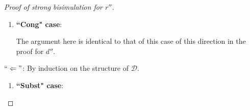 \documentclass[11pt]{article} %
\begin{document}
\begin{proof}[Proof of strong bisimulation for $r''$]
\begin{enumerate}
\begin{itemize}
From here, the argument proceeds analogously to that of $`` \Rightarrow "$, ``Subst" case, Case 1, in the proof for $d''$.

\item \underline{Case 2}: $q$ is hole pattern without arguments or where the first argument has codata type:

Then the equation is left unchanged by $r''$ except for refunctionalizing the right-hand term, as can be seen directly in the definition of $r''$ (last set in the highest-level union). Proceed as in Case 1.

\item \underline{Case 3}: $q$ is hole pattern and has a first argument with data type:

Then the function definition that contains $`` q = s' "$ contains only equations where the left-hand side is a hole pattern (other cases are excluded by the relevant input fragment for $d''$), and it has a first argument with data type. Thus $s$ reduces to $t$ already with respect to the part of the program that is passed to $des\_conv$, and then the result of this to $r^{core}$, as specified in the definition of $r''$. Let the part passed to $des\_conv$ be $prg'$; it is: $s \longrightarrow_{prg'} t$.

By (*) we have

\begin{equation*}
s \longrightarrow_{prg'} t \iff \langle s \rangle \longrightarrow_{\langle prg' \rangle^{r^{core}}} \langle t \rangle,
\end{equation*}

But this program $\langle prg' \rangle^{r^{core}}$ is a subset of $\langle prg \rangle$, as can be seen in the definition of $r''$. Thus we have the desired $\langle s \rangle \longrightarrow_{\langle prg \rangle} \langle t \rangle$.

\end{itemize}

\item \textbf{``Cong" case}:

The argument here is identical to that of this case of this direction in the proof for $d''$.

\end{enumerate}

$`` \Leftarrow "$: By induction on the structure of $\mathcal{D}$.

\begin{enumerate}
\item \textbf{``Subst" case}:


\end{enumerate}
\end{proof}
\end{document}

